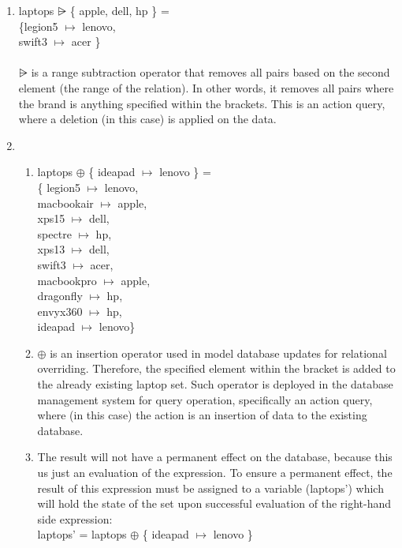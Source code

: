 \begin{enumerate}
\item laptops $\nrres$ \{ apple, dell, hp \} = \\
\{legion5 $\mapsto$ lenovo, \\
swift3 $\mapsto$ acer \}
\\ \\
$\nrres$ is a range subtraction operator that removes all pairs based on the second element (the range of the relation). In other words, it removes all pairs where the brand is anything specified within the brackets. This is an action query, where a deletion (in this case) is applied on the data.\\

\item 
\begin {enumerate} 
\item laptops $\oplus$ \{ ideapad $\mapsto$ lenovo \} = \\
\{ legion5 $\mapsto$ lenovo, \\
macbookair $\mapsto$ apple, \\
xps15 $\mapsto$ dell, \\
spectre $\mapsto$ hp, \\
xps13 $\mapsto$ dell, \\
swift3 $\mapsto$ acer, \\
macbookpro $\mapsto$ apple, \\
dragonfly $\mapsto$ hp, \\
envyx360 $\mapsto$ hp, \\
ideapad $\mapsto$ lenovo\} \\

\item $\oplus$ is an insertion operator used in model database updates for relational overriding. Therefore, the specified element within the bracket is added to the already existing laptop set. Such operator is deployed in the database management system for query operation, specifically an action query, where (in this case) the action is an insertion of data to the existing database.  \\

\item The result will not have a permanent effect on the database, because this us just an  evaluation of the expression. To ensure a permanent effect, the result of this expression must be assigned to a variable (laptops') which will hold the state of the set upon successful evaluation of the right-hand side expression: \\
laptops' = laptops $\oplus$ \{ ideapad $\mapsto$ lenovo \}
\end{enumerate}

\end{enumerate}

